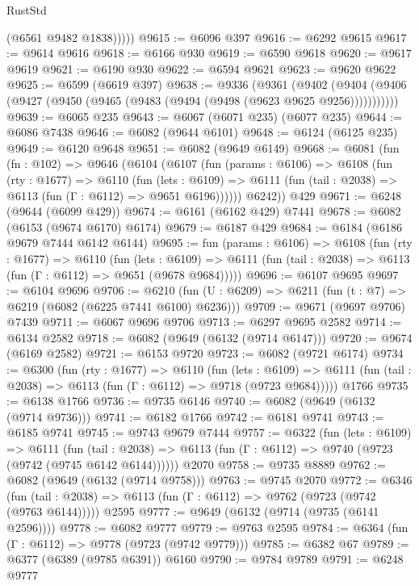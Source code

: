 \begin{lexlean}{RustStd}
\begin{coremodule}
            (@6561 @9482 @1838)))))
@9615 := @6096 @397
@9616 := @6292 @9615
@9617 := @9614 @9616
@9618 := @6166 @930
@9619 := @6590 @9618
@9620 := @9617 @9619
@9621 := @6190 @930
@9622 := @6594 @9621
@9623 := @9620 @9622
@9625 := @6599 (@6619 @397)
@9638 := @9336
    (@9361
      (@9402 (@9404 (@9406 (@9427 (@9450 (@9465 (@9483 (@9494 (@9498 (@9623 @9625 @9256)))))))))))
@9639 := @6065 @235
@9643 := @6067 (@6071 @235) (@6077 @235)
@9644 := @6086 @7438
@9646 := @6082 (@9644 @6101)
@9648 := @6124 (@6125 @235)
@9649 := @6120 @9648
@9651 := @6082 (@9649 @6149)
@9668 := @6081
    (fun (fn : @102) =>
    @9646
      (@6104
        (@6107
          (fun (params : @6106) =>
          @6108
            (fun (rty : @1677) =>
            @6110
              (fun (lets : @6109) =>
              @6111 (fun (tail : @2038) => @6113 (fun (Γ : @6112) => @9651 @6196))))))
        @6242))
    @429
@9671 := @6248 (@9644 (@6099 @429))
@9674 := @6161 (@6162 @429) @7441
@9678 := @6082 (@6153 (@9674 @6170) @6174)
@9679 := @6187 @429
@9684 := @6184 (@6186 @9679 @7444 @6142 @6144)
@9695 := fun (params : @6106) =>
  @6108
    (fun (rty : @1677) =>
    @6110
      (fun (lets : @6109) =>
      @6111 (fun (tail : @2038) => @6113 (fun (Γ : @6112) => @9651 (@9678 @9684)))))
@9696 := @6107 @9695
@9697 := @6104 @9696
@9706 := @6210 (fun (U : @6209) => @6211 (fun (t : @7) => @6219 (@6082 (@6225 @7441 @6100) @6236)))
@9709 := @9671 (@9697 @9706) @7439
@9711 := @6067 @9696 @9706
@9713 := @6297 @9695 @2582
@9714 := @6134 @2582
@9718 := @6082 (@9649 (@6132 (@9714 @6147)))
@9720 := @9674 (@6169 @2582)
@9721 := @6153 @9720
@9723 := @6082 (@9721 @6174)
@9734 := @6300
    (fun (rty : @1677) =>
    @6110
      (fun (lets : @6109) =>
      @6111 (fun (tail : @2038) => @6113 (fun (Γ : @6112) => @9718 (@9723 @9684)))))
    @1766
@9735 := @6138 @1766
@9736 := @9735 @6146
@9740 := @6082 (@9649 (@6132 (@9714 @9736)))
@9741 := @6182 @1766
@9742 := @6181 @9741
@9743 := @6185 @9741
@9745 := @9743 @9679 @7444
@9757 := @6322
    (fun (lets : @6109) =>
    @6111
      (fun (tail : @2038) => @6113 (fun (Γ : @6112) => @9740 (@9723 (@9742 (@9745 @6142 @6144))))))
    @2070
@9758 := @9735 @8889
@9762 := @6082 (@9649 (@6132 (@9714 @9758)))
@9763 := @9745 @2070
@9772 := @6346
    (fun (tail : @2038) => @6113 (fun (Γ : @6112) => @9762 (@9723 (@9742 (@9763 @6144)))))
    @2595
@9777 := @9649 (@6132 (@9714 (@9735 (@6141 @2596))))
@9778 := @6082 @9777
@9779 := @9763 @2595
@9784 := @6364 (fun (Γ : @6112) => @9778 (@9723 (@9742 @9779)))
@9785 := @6382 @67
@9789 := @6377 (@6389 (@9785 @6391)) @6160
@9790 := @9784 @9789
@9791 := @6248 @9777

\end{coremodule}
\end{lexlean}
